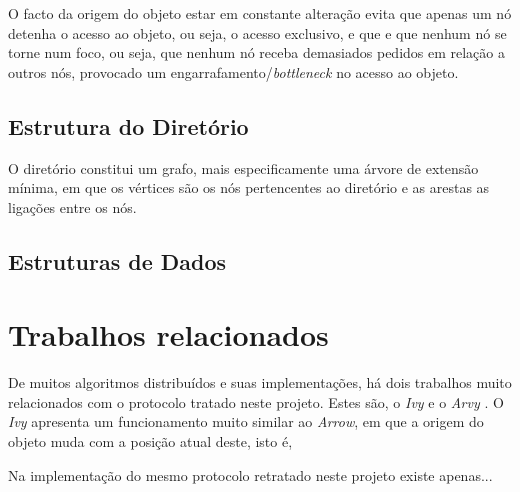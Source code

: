 O facto da origem do objeto estar em constante alteração evita que apenas um nó detenha o acesso ao objeto, ou seja, o acesso exclusivo, e que e que nenhum nó se torne num foco, ou seja, que nenhum nó receba demasiados pedidos em relação a outros nós, provocado um engarrafamento/\emph{bottleneck} no acesso ao objeto.


\subsection{Estrutura do Diretório}


O diretório constitui um grafo, mais especificamente uma árvore de extensão mínima, em que os vértices são os nós pertencentes ao diretório e as arestas as ligações entre os nós.


\begin{comment}
     elementos
     - Nodes
    vértices do grafo
     

     - Ligações entre os nodes (ligação de finds e ligação do MyChan, ver ARVY)
     explicar porque é que as ligações viram
     - envios do obj são diretos
\end{comment}

\subsection{Estruturas de Dados}


\section{Trabalhos relacionados}
De muitos algoritmos distribuídos e suas implementações, há dois trabalhos muito relacionados com o protocolo tratado neste projeto. Estes são, o \emph{Ivy} \cite{Ivy} e o \emph{Arvy} \cite{Arvy}.
O \emph{Ivy} apresenta um funcionamento muito similar ao \emph{Arrow}, em que a origem do objeto muda com a posição atual deste, isto é, 


Na implementação do mesmo protocolo retratado neste projeto existe apenas...



